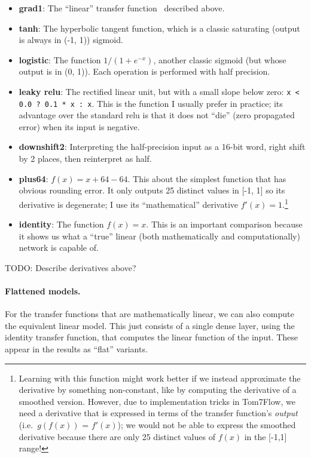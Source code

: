 \documentclass[twocolumn]{article}
\begin{document}
\begin{itemize}
\item {\bf grad1}: The ``linear'' transfer function \gradone\ described above.
\item {\bf tanh}: The hyperbolic tangent function, which is a classic saturating (output is always in (-1, 1)) sigmoid.
\item {\bf logistic}: The function $1 / (1 + e^{-x})$, another classic sigmoid (but whose output is in (0, 1)). Each operation is performed with half precision.
\item {\bf leaky relu}: The rectified linear unit, but with a small slope below zero: \verb|x < 0.0 ? 0.1 * x : x|. This is the function I usually prefer in practice; its advantage over the standard relu is that it does not ``die'' (zero propagated error) when its input is negative.
\item {\bf downshift2}: Interpreting the half-precision input as a 16-bit word, right shift by 2 places, then reinterpret as half.
\item {\bf plus64}: $f(x) = x + 64 - 64$. This about the simplest function that has obvious rounding error. It only outputs 25 distinct values in [-1, 1] so its derivative is degenerate; I use its ``mathematical'' derivative $f'(x) = 1$.\footnote{Learning with this function might work better if we instead approximate the derivative by something non-constant, like by computing the derivative of a smoothed version. However, due to implementation tricks in Tom7Flow, we need a derivative that is expressed in terms of the transfer function's {\it output} (i.e.~$g(f(x))$ = $f'(x)$); we would not be able to express the smoothed derivative because there are only 25 distinct values of $f(x)$ in the [-1,1] range!}
\item {\bf identity}: The function $f(x) = x$. This is an important comparison because it shows us what a ``true'' linear (both mathematically and computationally) network is capable of.
\end{itemize}

TODO: Describe derivatives above?

\paragraph{Flattened models.}
For the transfer functions that are mathematically linear, we can also
compute the equivalent linear model. This just consists of a single
dense layer, using the identity transfer function, that computes the
linear function of the input. These appear in the results as ``flat''
variants.
\end{document}

